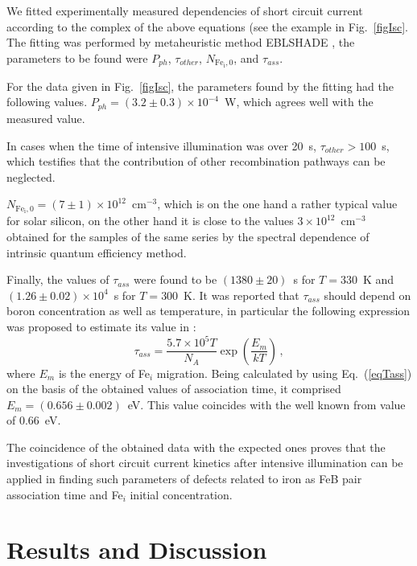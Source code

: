 \documentclass[sn-mathphys]{sn-jnl}%
\theoremstyle{thmstyleone}%
\theoremstyle{thmstyletwo}%
\theoremstyle{thmstylethree}%
\begin{document}
We fitted experimentally measured dependencies of short circuit current
according to the complex of the above equations (see the example in Fig.~\ref{figIsc}.
The fitting was performed by metaheuristic method EBLSHADE \cite{EBLSHADE},
the parameters to be found were $P_{ph}$, $\tau_{other}$, $N_\mathrm{Fe_i,0}$, and $\tau_{ass}$.

For the data given in Fig.~\ref{figIsc},
the parameters found by the fitting had the following values.
$P_{ph}=(3.2\pm0.3)\times 10^{-4}$~W, which agrees well with the measured value.

In cases when the time of intensive illumination was over 20~s,
$\tau_{other}>100$~s, which testifies that the contribution of other recombination pathways can be neglected.

$N_\mathrm{Fe_i,0}=(7\pm1)\times10^{12}$~cm$^{-3}$,
      which is on the one hand a rather typical value for solar silicon,
      on the other hand it is close to the values $3\times10^{12}$~cm$^{-3}$
      obtained for the samples of the same series by the spectral dependence of intrinsic quantum efficiency method.

Finally, the values of $\tau_{ass}$ were found
  to be $(1380\pm20)$~s for $T=330$~K and $(1.26\pm0.02)\times10^4$~s for $T=300$~K.
  It was reported that $\tau_{ass}$ should depend on boron concentration as well as temperature,
  in particular the following expression was proposed to estimate its value in \cite{FeBAssJAP2014}:
\begin{equation}
\label{eqTass}
\tau_{ass}=\frac{5.7\times10^5T}{N_A}\exp\left(\frac{E_m}{kT}\right)\,,
\end{equation}
where
$E_m$ is the energy of Fe$_i$ migration.
Being calculated by using Eq.~(\ref{eqTass}) on the basis of the obtained
values of association time, it comprised $E_m=(0.656\pm0.002)$~eV.
This value coincides with the well known from \cite{FeBAssJAP2014,FeBkinAPL2008} value  of 0.66~eV.

The coincidence of the obtained data with the expected ones
proves that the investigations of short circuit current kinetics
after intensive illumination can be applied in finding such parameters of defects related to iron
as FeB pair association time and Fe$_i$ initial concentration.

\section{Results and Discussion}
\end{document}
